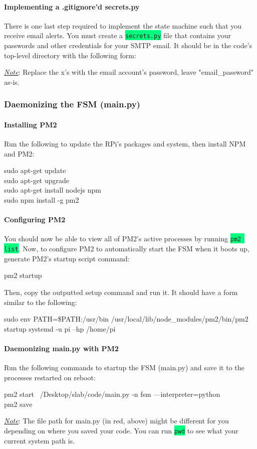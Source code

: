 \documentclass{article}
\newcommand*{\myfont}{\fontfamily{pcr}\selectfont}
\newcommand{\codei}[1]{\colorbox{SpringGreen}{\texttt{#1}}} %
\newcommand{\codeb}[2]{
  \begin{tcolorbox}[width=\textwidth,colback={SpringGreen},title={#1},colbacktitle=darkgreen,coltitle=SpringGreen]
    \myfont
    #2
  \end{tcolorbox}
} %
\newcommand{\outputb}[2]{
  \begin{tcolorbox}[width=\textwidth,colback={light-gray},title={#1},colbacktitle=gray,coltitle=light-gray]
    \myfont
    #2
  \end{tcolorbox}
} %
\newcommand{\red}[1]{\textcolor{BrickRed}{#1}} %
\newcommand{\note}[1]{\underline{\textit{Note}}: #1}
\begin{document}
    \paragraph{Implementing a .gitignore'd secrets.py}
    There is one last step required to implement the state machine such that you receive email alerts. You must create a \codei{secrets.py} file that contains your passwords and other credentials for your SMTP email. It should be in the code's top-level directory with the following form:
    
    \note{Replace the x's with the email account's password, leave "email_password" as-is.}


  \subsubsection{Daemonizing the FSM (main.py)}
    \paragraph{Installing PM2}
    Run the following to update the RPi's packages and system, then install NPM and PM2:
    \codeb{Update RPi and install NPM and PM2}{
        sudo apt-get update \\
        sudo apt-get upgrade \\
        sudo apt-get install nodejs npm \\
        sudo npm install -g pm2 \\
    }
    \paragraph{Configuring PM2}
    You should now be able to view all of PM2's active processes by running \codei{pm2 list}. Now, to configure PM2 to automatically start the FSM when it boots up, generate PM2's startup script command:
    \codeb{Generate PM2's startup script command}{pm2 startup}
    Then, copy the outputted setup command and run it. It should have a form similar to the following:
    \outputb{Generate PM2's startup script (this is output, DO NOT EXECUTE IT)}{sudo env PATH=\$PATH:/usr/bin /usr/local/lib/node\_modules/pm2/bin/pm2 startup systemd -u pi --hp /home/pi}
    \paragraph{Daemonizing main.py with PM2}
    Run the following commands to startup the FSM (main.py) and save it to the processes restarted on reboot:
    \codeb{Start FSM process; save it to reboot processes}{
        pm2 start \red{~/Desktop/slab/code/main.py} -n fsm ---interpreter=python \\
        pm2 save
    }
    \note{The file path for main.py (in red, above) might be different for you depending on where you saved your code. You can run \codei{pwd} to see what your current system path is.}
\end{document}
